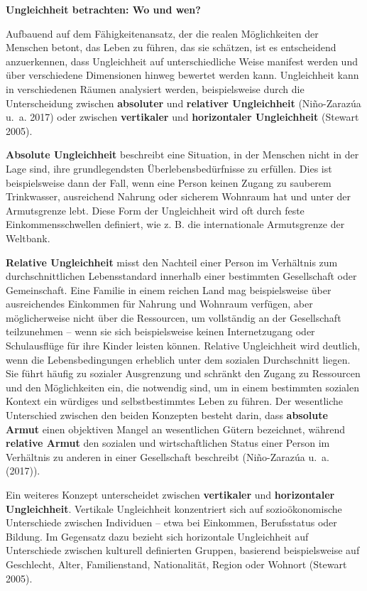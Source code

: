 \documentclass[
  nswissgerman,
  a4paper,
  openany]{book}
\begin{document}
\textbf{Ungleichheit betrachten: Wo und wen?}

Aufbauend auf dem Fähigkeitenansatz, der die realen Möglichkeiten der
Menschen betont, das Leben zu führen, das sie schätzen, ist es
entscheidend anzuerkennen, dass Ungleichheit auf unterschiedliche Weise
manifest werden und über verschiedene Dimensionen hinweg bewertet werden
kann. Ungleichheit kann in verschiedenen Räumen analysiert werden,
beispielsweise durch die Unterscheidung zwischen \textbf{absoluter} und
\textbf{relativer Ungleichheit} (Niño-Zarazúa u.~a. 2017) oder zwischen
\textbf{vertikaler} und \textbf{horizontaler Ungleichheit} (Stewart
2005).

\textbf{Absolute Ungleichheit} beschreibt eine Situation, in der
Menschen nicht in der Lage sind, ihre grundlegendsten
Überlebensbedürfnisse zu erfüllen. Dies ist beispielsweise dann der
Fall, wenn eine Person keinen Zugang zu sauberem Trinkwasser,
ausreichend Nahrung oder sicherem Wohnraum hat und unter der
Armutsgrenze lebt. Diese Form der Ungleichheit wird oft durch feste
Einkommensschwellen definiert, wie z. B. die internationale Armutsgrenze
der Weltbank.

\textbf{Relative Ungleichheit} misst den Nachteil einer Person im
Verhältnis zum durchschnittlichen Lebensstandard innerhalb einer
bestimmten Gesellschaft oder Gemeinschaft. Eine Familie in einem reichen
Land mag beispielsweise über ausreichendes Einkommen für Nahrung und
Wohnraum verfügen, aber möglicherweise nicht über die Ressourcen, um
vollständig an der Gesellschaft teilzunehmen -- wenn sie sich
beispielsweise keinen Internetzugang oder Schulausflüge für ihre Kinder
leisten können. Relative Ungleichheit wird deutlich, wenn die
Lebensbedingungen erheblich unter dem sozialen Durchschnitt liegen. Sie
führt häufig zu sozialer Ausgrenzung und schränkt den Zugang zu
Ressourcen und den Möglichkeiten ein, die notwendig sind, um in einem
bestimmten sozialen Kontext ein würdiges und selbstbestimmtes Leben zu
führen. Der wesentliche Unterschied zwischen den beiden Konzepten
besteht darin, dass \textbf{absolute Armut} einen objektiven Mangel an
wesentlichen Gütern bezeichnet, während \textbf{relative Armut} den
sozialen und wirtschaftlichen Status einer Person im Verhältnis zu
anderen in einer Gesellschaft beschreibt (Niño-Zarazúa u.~a. (2017)).

Ein weiteres Konzept unterscheidet zwischen \textbf{vertikaler} und
\textbf{horizontaler Ungleichheit}. Vertikale Ungleichheit konzentriert
sich auf sozioökonomische Unterschiede zwischen Individuen -- etwa bei
Einkommen, Berufsstatus oder Bildung. Im Gegensatz dazu bezieht sich
horizontale Ungleichheit auf Unterschiede zwischen kulturell definierten
Gruppen, basierend beispielsweise auf Geschlecht, Alter, Familienstand,
Nationalität, Region oder Wohnort (Stewart 2005).
\end{document}
